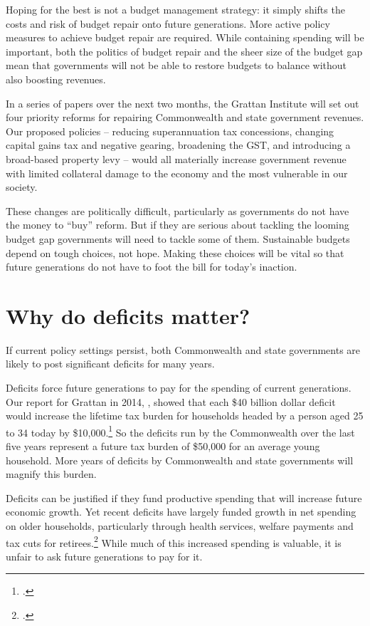 \documentclass[twoside,english]{grattanBudgetRepairb5portrait}
\begin{document}
\begin{overview}[-40pt]
Hoping for the best is not a budget management strategy: it simply shifts the costs and risk of budget repair onto future generations. More active policy measures to achieve budget repair are required. While containing spending will be important, both the politics of budget repair and the sheer size of the budget gap mean that governments will not be able to restore budgets to balance without also boosting revenues.

In a series of papers over the next two months, the Grattan Institute will set out four priority reforms for repairing Commonwealth and state government revenues. Our proposed policies – reducing superannuation tax concessions, changing capital gains tax and negative gearing, broadening the GST, and introducing a broad-based property levy – would all materially increase government revenue with limited collateral damage to the economy and the most vulnerable in our society.

These changes are politically difficult, particularly as governments do not have the money to “buy” reform. But if they are serious about tackling the looming budget gap governments will need to tackle some of them. Sustainable budgets depend on tough choices, not hope. Making these choices will be vital so that future generations do not have to foot the bill for today’s inaction.

\end{overview}
\makeatletter\@openrightfalse
\cleardoubleevenstandardpage
\chapter{Why do deficits matter?}\label{chapter:FISCAL-1}
If current policy settings persist, both Commonwealth and state governments are likely to post significant deficits for many years. 

Deficits force future generations to pay for the spending of current generations. Our report for Grattan in 2014, , showed that each \$40 billion dollar deficit would increase the lifetime tax burden for households headed by a person aged 25 to 34 today by \$10,000.\footcite[][9]{DaleyWoodWeidmannEtAl2014} So the deficits run by the Commonwealth over the last five years represent a future tax burden of \$50,000 for an average young household. More years of deficits by Commonwealth and state governments will magnify this burden. 

Deficits can be justified if they fund productive spending that will increase future economic growth. Yet recent deficits have largely funded growth in net spending on older households, particularly through health services, welfare payments and tax cuts for retirees.\footcite[][9]{DaleyWoodWeidmannEtAl2014}  While much of this increased spending is valuable, it is unfair to ask future generations to pay for it. 
\end{document}
